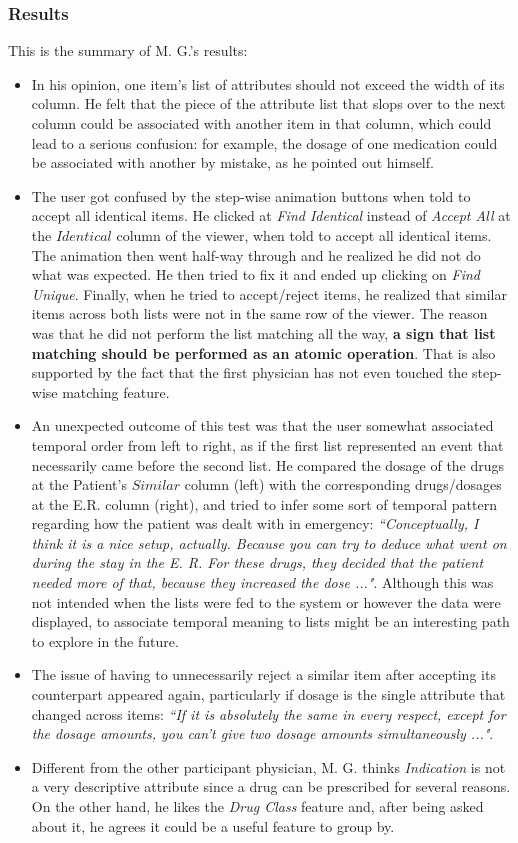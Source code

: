 \documentclass{chi2009}
\newcommand{\Similar}{\textit{Similar}}
\newcommand{\Identical}{\textit{Identical}}
\begin{document}
\subsubsection{Results}
This is the summary of M. G.'s results:
\begin{itemize}
\item In his opinion, one item's list of attributes should not exceed the width of its column. He felt that the piece of the attribute list that slops over to the next column could be associated with another item in that column, which could lead to a serious confusion: for example, the dosage of one medication could be associated with another by mistake, as he pointed out himself. 
\item The user got confused by the step-wise animation buttons when told to accept all identical items. He clicked at \textit{Find Identical} instead of \textit{Accept All} at the $\Identical$ column of the viewer, when told to accept all identical items. The animation then went half-way through and he realized he did not do what was expected. He then tried to fix it and ended up clicking on \textit{Find Unique}. Finally, when he tried to accept/reject items, he realized that similar items across both lists were not in the same row of the viewer. The reason was that he did not perform the list matching all the way, \textbf{a sign that list matching should be performed as an atomic operation}. That is also supported by the fact that the first physician has not even touched the step-wise matching feature.
\item An unexpected outcome of this test was that the user somewhat associated temporal order from left to right, as if the first list represented an event that necessarily came before the second list. He compared the dosage of the drugs at the Patient's $\Similar$ column (left) with the corresponding drugs/dosages at the E.R. column (right), and tried to infer some sort of temporal pattern regarding how the patient was dealt with in emergency: \textit{``Conceptually, I think it is a nice setup, actually. Because you can try to deduce what went on during the stay in the E. R. For these drugs, they decided that the patient needed more of that, because they increased the dose ..."}. Although this was not intended when the lists were fed to the system or however the data were displayed, to associate temporal meaning to lists might be an interesting path to explore in the future.
\item The issue of having to unnecessarily reject a similar item after accepting its counterpart appeared again, particularly if dosage is the single attribute that changed across items: \textit{``If it is absolutely the same in every respect, except for the dosage amounts, you can't give two dosage amounts simultaneously ..."}.
\item Different from the other participant physician, M. G.  thinks \textit{Indication} is not a very descriptive attribute since a drug can be prescribed for several reasons. On the other hand, he likes the \textit{Drug Class} feature and, after being asked about it, he agrees it could be a useful feature to group by.
\end{itemize}
\end{document}
